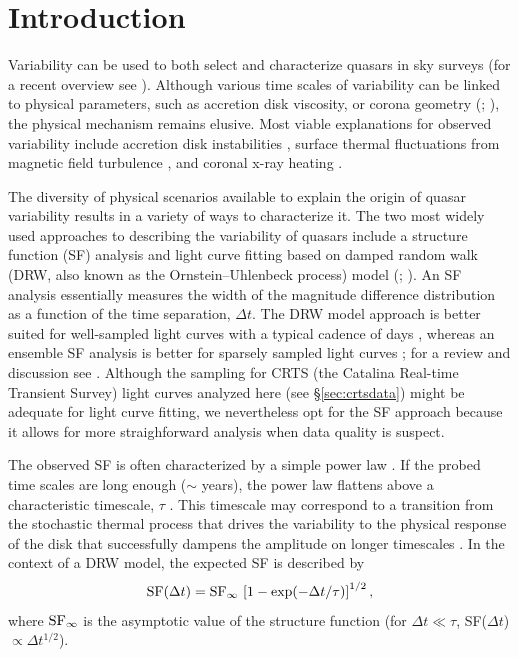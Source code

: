 \documentclass[fleqn,usenatbib]{mnras}
\begin{document}
\section{Introduction}
Variability can be used to both select and characterize quasars in sky surveys (for a recent overview see \citealt{lawrence2016a}). Although various time scales of variability can be linked to physical parameters, such as accretion disk viscosity, or corona geometry (\citealt{kelly2011}; \citealt{graham2014}), the physical mechanism remains elusive. Most viable explanations for observed
variability include accretion disk instabilities \citep{kawaguchi1998}, surface thermal fluctuations from magnetic field turbulence \citep{kelly2009}, and
coronal x-ray heating \citep[][see \citealt{kozlowski2016} for a review]{kelly2011}.

The diversity of  physical scenarios available to explain the origin of quasar variability results in a variety of ways to characterize it. The two most widely used approaches to describing the variability of quasars include a structure function (SF) analysis and light curve
fitting based on damped random walk (DRW, also known as the Ornstein--Uhlenbeck process) model (\citealt{kelly2007}; \citealt{macleod2011}). An SF analysis essentially measures the 
width of the magnitude difference distribution as a function of the time separation, $\Delta t$. 
The DRW model approach is better suited for well-sampled light curves with a typical cadence of days \citep{zu2013, kozlowski2016}, whereas an ensemble SF analysis is better for sparsely sampled light curves \citep{hawkins2002, berk2004,  devries2005}; for a review and discussion see \cite{kozlowski2016}. Although the sampling for CRTS (the Catalina Real-time Transient Survey) light curves 
analyzed here (see \S\ref{sec:crtsdata}) might be adequate for light curve fitting, we nevertheless opt for 
the SF approach because it allows for more straighforward analysis when data quality is suspect. 

The observed SF is often characterized by a simple power law \citep{schmidt2010}. If the probed time scales are long enough 
($\sim$ years), the power law flattens above a characteristic timescale, $\tau$ \citep{2004Ivezic, kelly2007, macleod2010}.
This timescale may correspond to a transition from the stochastic thermal process that drives the variability to the physical 
response of the disk that successfully  dampens the amplitude on longer timescales \citep{peterson2001, kelly2007, kelly2009, 
kelly2011, lawrence2016a}. In the context of a DRW model, the expected SF is described by 
\begin{equation}
\label{eq:DRWSF}
        {\rm SF}(\Delta t) = {\rm SF}_\infty \, \left[1 - \exp(-\Delta t / \tau) \right]^{1/2},
\end{equation}
where ${\rm SF}_\infty$ is the asymptotic value of the structure function (for $\Delta t \ll \tau$, SF($\Delta t$) $\propto \Delta t^{1/2}$). 
\end{document}
